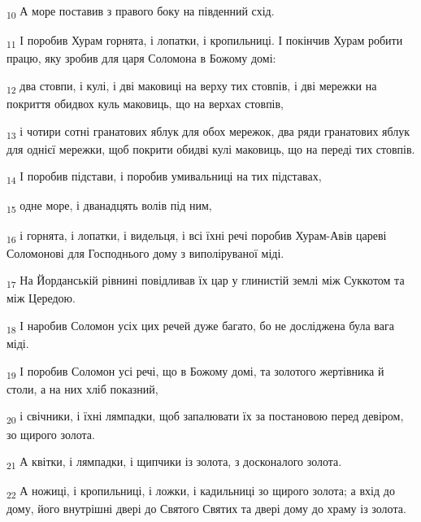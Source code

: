 \begin{tcolorbox}
\textsubscript{10} А море поставив з правого боку на південний схід.
\end{tcolorbox}
\begin{tcolorbox}
\textsubscript{11} І поробив Хурам горнята, і лопатки, і кропильниці. І покінчив Хурам робити працю, яку зробив для царя Соломона в Божому домі:
\end{tcolorbox}
\begin{tcolorbox}
\textsubscript{12} два стовпи, і кулі, і дві маковиці на верху тих стовпів, і дві мережки на покриття обидвох куль маковиць, що на верхах стовпів,
\end{tcolorbox}
\begin{tcolorbox}
\textsubscript{13} і чотири сотні гранатових яблук для обох мережок, два ряди гранатових яблук для однієї мережки, щоб покрити обидві кулі маковиць, що на переді тих стовпів.
\end{tcolorbox}
\begin{tcolorbox}
\textsubscript{14} І поробив підстави, і поробив умивальниці на тих підставах,
\end{tcolorbox}
\begin{tcolorbox}
\textsubscript{15} одне море, і дванадцять волів під ним,
\end{tcolorbox}
\begin{tcolorbox}
\textsubscript{16} і горнята, і лопатки, і видельця, і всі їхні речі поробив Хурам-Авів цареві Соломонові для Господнього дому з виполіруваної міді.
\end{tcolorbox}
\begin{tcolorbox}
\textsubscript{17} На Йорданській рівнині повідливав їх цар у глинистій землі між Суккотом та між Цередою.
\end{tcolorbox}
\begin{tcolorbox}
\textsubscript{18} І наробив Соломон усіх цих речей дуже багато, бо не досліджена була вага міді.
\end{tcolorbox}
\begin{tcolorbox}
\textsubscript{19} І поробив Соломон усі речі, що в Божому домі, та золотого жертівника й столи, а на них хліб показний,
\end{tcolorbox}
\begin{tcolorbox}
\textsubscript{20} і свічники, і їхні лямпадки, щоб запалювати їх за постановою перед девіром, зо щирого золота.
\end{tcolorbox}
\begin{tcolorbox}
\textsubscript{21} А квітки, і лямпадки, і щипчики із золота, з досконалого золота.
\end{tcolorbox}
\begin{tcolorbox}
\textsubscript{22} А ножиці, і кропильниці, і ложки, і кадильниці зо щирого золота; а вхід до дому, його внутрішні двері до Святого Святих та двері дому до храму із золота.
\end{tcolorbox}
